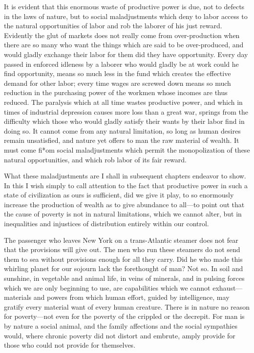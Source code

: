 \documentclass{book}
\begin{document}
It is evident that this enormous waste of productive power is due, not to defects in the laws of nature, but to social maladjustments which deny to labor access to the natural opportunities of labor and rob the laborer of his just reward. Evidently the glut of markets does not really come from over-production when there are so many who want the things which are said to be over-produced, and would gladly exchange their labor for them did they have opportunity. Every day passed in enforced idleness by a laborer who would gladly be at work could he find opportunity, means so much less in the fund which creates the effective demand for other labor; every time wages are screwed down means so much reduction in the purchasing power of the workmen whose incomes are thus reduced. The paralysis which at all time wastes productive power, and which in times of industrial depression causes more loss than a great war, springs from the difficulty which those who would gladly satisfy their wants by their labor find in doing so. It cannot come from any natural limitation, so long as human desires remain unsatisfied, and nature yet offers to man the raw material of wealth. It must come fi*om social maladjustments which permit the monopolization of these natural opportunities, and which rob labor of its fair reward.

What these maladjustments are I shall in subsequent chapters endeavor to show. In this I wish simply to call attention to the fact that productive power in such a state of civilization as ours is sufficient, did we give it play, to so enormously increase the production of wealth as to give abundance to all—to point out that the cause of poverty is not in natural limitations, which we cannot alter, but in inequalities and injustices of distribution entirely within our control.

The passenger who leaves New York on a trans-Atlantic steamer does not fear that the provisions will give out. The men who run these steamers do not send them to sea without provisions enough for all they carry. Did he who made this whirling planet for our sojourn lack the forethought of man? Not so. In soil and sunshine, in vegetable and animal life, in veins of minerals, and in pulsing forces which we are only beginning to use, are capabilities which we cannot exhaust—materials and powers from which human effort, guided by intelligence, may gratify every material want of every human creature. There is in nature no reason for poverty—not even for the poverty of the crippled or the decrepit. For man is by nature a social animal, and the family affections and the social sympathies would, where chronic poverty did not distort and embrute, amply provide for those who could not provide for themselves.
\end{document}
